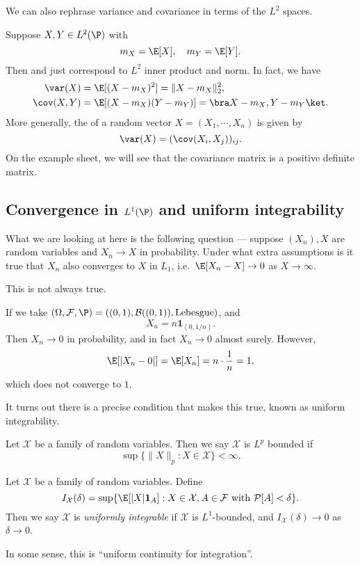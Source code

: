 \documentclass[a4paper]{article}
\begin{document}
We can also rephrase variance and covariance in terms of the $L^2$ spaces.

Suppose $X, Y \in L^2(\P)$ with
\[
  m_X = \E[X],\quad m_Y = \E[Y].
\]
Then  and  just correspond to $L^2$ inner product and norm. In fact, we have
\begin{align*}
  \var(X) &= \E[(X - m_X)^2] = \|X - m_X\|_2^2,\\
  \cov(X, Y) &= \E[(X - m_X)(Y - m_Y)] = \bra X - m_X, Y - m_Y\ket.
\end{align*}
More generally, the  of a random vector $X = (X_1, \cdots, X_n)$ is given by
\[
  \var(X) =(\cov(X_i, X_j))_{ij}.
\]
On the example sheet, we will see that the covariance matrix is a positive definite matrix.

\subsection{Convergence in \texorpdfstring{$L^1(\P)$}{L1(P)} and uniform integrability}
What we are looking at here is the following question --- suppose $(X_n), X$ are random variables and $X_n \to X$ in probability. Under what extra assumptions is it true that $X_n$ also converges to $X$ in $L_1$, i.e.\ $\E[X_n - X] \to 0$ as $X \to \infty$.

This is not always true.

\begin{eg}
  If we take $(\Omega, \mathcal{F}, \P) = ((0, 1), \mathcal{B}((0, 1)), \text{Lebesgue})$, and
  \[
    X_n = n\mathbf{1}_{(0, 1/n)}.
  \]
  Then $X_n \to 0$ in probability, and in fact $X_n \to 0$ almost surely. However,
  \[
    \E[|X_n - 0|] = \E[X_n] = n \cdot \frac{1}{n} = 1,
  \]
  which does not converge to $1$.
\end{eg}

It turns out there is a precise condition that makes this true, known as uniform integrability.

\begin{defi}[$L^p$-bounded]
  Let $\mathcal{X}$ be a family of random variables. Then we say $\mathcal{X}$ is $L^p$ bounded if
  \[
    \sup\{\|X\|_p: X \in \mathcal{X}\} < \infty.
  \]
\end{defi}

\begin{defi}
  Let $\mathcal{X}$ be a family of random variables. Define
  \[
    I_\mathcal{X}(\delta) = \sup\{\E[|X|\mathbf{1}_A]: X \in \mathcal{X}, A \in \mathcal{F} \text{ with }\mathcal{P}[A] < \delta\}.
  \]
  Then we say $\mathcal{X}$ is \emph{uniformly integrable} if $\mathcal{X}$ is $L^1$-bounded, and $I_\mathcal{X}(\delta) \to 0$ as $\delta \to 0$.
\end{defi}
In some sense, this is ``uniform continuity for integration''.
\end{document}
